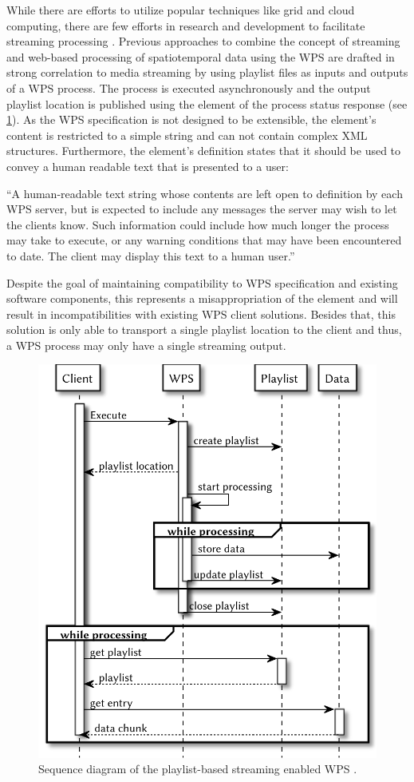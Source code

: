 While there are efforts to utilize popular techniques like grid and cloud computing, there are few efforts in research and development to facilitate streaming processing \citep{foerster2012live}. Previous approaches to combine the concept of streaming and web-based processing of spatiotemporal data using the \ac{WPS} are drafted in strong correlation to media streaming \citep{foerster2012live} by using playlist files \citep{ietf:draft-pantos-http-live-streaming-12} as inputs and outputs of a \ac{WPS} process. The process is executed asynchronously and the output playlist location is published using the  element of the process status response (see \cref{fig:sd:previous}). As the \ac{WPS} specification is not designed to be extensible, the element's content is restricted to a simple string and can not contain complex \ac{XML} structures. Furthermore, the element's definition states that it should be used to convey a human readable text that is presented to a user:
\begin{xquote}
  ``A human-readable text string whose contents are left open to definition by each WPS server, but is expected to include any messages the server may wish to let the clients know. Such information could include how much longer the process may take to execute, or any warning conditions that may have been encountered to date. The client may display this text to a human user.''
\end{xquote}
Despite the goal of maintaining compatibility to \ac{WPS} specification and existing software components, this represents a misappropriation of the element and will result in incompatibilities with existing \ac{WPS} client solutions. Besides that, this solution is only able to transport a single playlist location to the client and thus, a \ac{WPS} process may only have a single streaming output.

\begin{figure}[!htb]
  \centering
  \includegraphics[width = 0.54225352112676062\linewidth]{figures/sequence-diagram-previous.pdf}
  \caption[Sequence diagram of the playlist-based streaming enabled WPS.]{\label{fig:sd:previous}Sequence diagram of the playlist-based streaming enabled WPS \citep{foerster2012live}.}
\end{figure}

